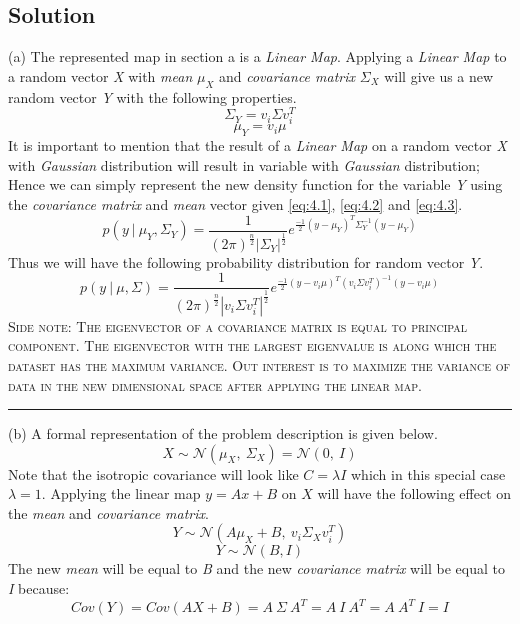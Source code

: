 \documentclass[12pt]{article}
\numberwithin{equation}{section}
\numberwithin{table}{section}
\numberwithin{figure}{section}
\begin{document}
\subsection*{Solution}
(a) The represented map in section a is a \textit{Linear Map}. Applying a \textit{Linear Map} to a random vector \textit{X} with \textit{mean} $\mu_X$ and \textit{covariance matrix} $\Sigma_X$ will give us a new random vector \textit{Y} with the following properties.
\begin{equation}\label{eq:4.2}
	\boxed{\Sigma_Y = v_i \Sigma v_i^T}
\end{equation}
\begin{equation}\label{eq:4.3}
\boxed{\mu_Y = v_i \mu}
\end{equation}
It is important to mention that the result of a \textit{Linear Map} on a random vector \textit{X} with \textit{Gaussian} distribution will result in variable  with \textit{Gaussian} distribution; Hence we can simply represent the new density function for the variable \textit{Y} using the \textit{covariance matrix} and \textit{mean} vector given \ref{eq:4.1}, \ref{eq:4.2} and \ref{eq:4.3}.
\begin{equation}\label{eq:4.4}
p(y\ |\ \mu_Y, \Sigma_Y) = \frac{1}{(2\pi)^\frac{n}{2}|\Sigma_Y|^\frac{1}{2}} e^{\frac{-1}{2}(y - \mu_Y)^T\Sigma_Y^{-1}(y - \mu_Y)} 
\end{equation}
Thus we will have the following probability distribution for random vector \textit{Y}.
$$
p(y\ |\ \mu, \Sigma) = \frac{1}{(2\pi)^\frac{n}{2}|v_i \Sigma v_i^T|^\frac{1}{2}} e^{\frac{-1}{2}(y - v_i \mu)^T(v_i \Sigma v_i^T)^{-1}(y - v_i \mu)}
$$
\textsc{Side note: The eigenvector of a covariance matrix is equal to principal component. The eigenvector with the largest eigenvalue is along which the dataset has the maximum variance. Out interest is to maximize the variance of data in the new dimensional space after applying the linear map.}

\noindent\rule{\textwidth}{.5pt}
(b) A formal representation of the problem description is given below.
$$
	X \sim \mathcal{N}(\mu_X, \ \Sigma_X) = \mathcal{N}(0, \ I)
$$
Note that the isotropic covariance will look like $C=\lambda I$ which in this special case $\lambda = 1$. Applying the linear map $y = Ax + B$ on $X$ will have the following effect on the \textit{mean} and \textit{covariance matrix}.
$$
	Y \sim \mathcal{N}(A\mu_X + B, \ v_i \Sigma_X v_i^T)
$$
$$
	Y \sim \mathcal{N}(B, I)
$$
The new \textit{mean} will be equal to \textit{B} and the new \textit{covariance matrix} will be equal to \textit{I} because:
$$
	Cov(Y) = Cov(AX + B) = A\ \Sigma \ A^T = A\ I\ A^T = A\ A^T\ I = I
$$
\end{document}
